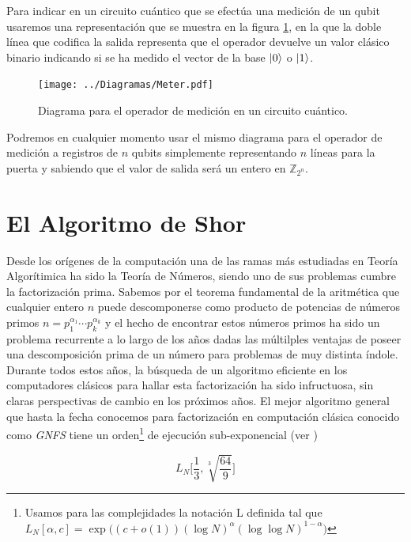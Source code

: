 \documentclass[11pt, spanish]{report}
\numberwithin{equation}{section}
\numberwithin{defin}{section}
\begin{document}
Para indicar en un circuito cuántico que se efectúa una medición de un qubit usaremos una representación que se muestra en la figura \ref{medidor}, en la que la doble línea que codifica la salida representa que el operador devuelve un valor clásico binario indicando si se ha medido el vector de la base $\ket{0}$ o $\ket{1}$.\\

\begin{figure}[h]
\begin{center}
\texttt{[image: ../Diagramas/Meter.pdf]}
\end{center}
\caption{Diagrama para el operador de medición en un circuito cuántico.}\label{medidor}
\end{figure}

Podremos en cualquier momento usar el mismo diagrama para el operador de medición a registros de $n$ qubits simplemente representando $n$ líneas para la puerta y sabiendo que el valor de salida será un entero en $\mathbb{Z}_{2^n}$.

\chapter{El Algoritmo de Shor}

Desde los orígenes de la computación una de las ramas más estudiadas en Teoría Algorítimica ha sido la Teoría de Números, siendo uno de sus problemas cumbre la factorización prima. Sabemos por el teorema fundamental de la aritmética que cualquier entero $n$ puede descomponerse como producto de potencias de números primos $n=p_1^{\alpha_1}\cdots p_k^{\alpha_k}$ y el hecho de encontrar estos números primos ha sido un problema recurrente a lo largo de los años dadas las múltilples ventajas de poseer una descomposición prima de un número para problemas de muy distinta índole. \\

Durante todos estos años, la búsqueda de un algoritmo eficiente en los computadores clásicos para hallar esta factorización ha sido infructuosa, sin claras perspectivas de cambio en los próximos años. El mejor algoritmo general que hasta la fecha conocemos para factorización en computación clásica conocido como \emph{GNFS} tiene un orden\footnote{Usamos para las complejidades la notación L definida tal que  $L_N[\alpha, c]=\exp\Big((c+o(1))(\log N)^\alpha(\log\log N)^{1-\alpha}\Big)$} de ejecución sub-exponencial\footnotemark{} (ver \cite{LEE201892})

\begin{equation}
L_N\Big[\frac{1}{3},\sqrt[3]{\frac{64}{9}}\Big]
\end{equation} 
\end{document}
